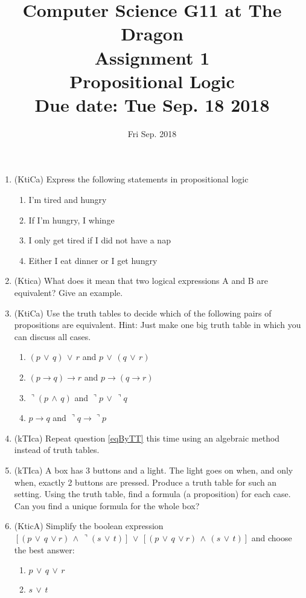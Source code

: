 \documentclass{article}
\title{
Computer Science G11 at The Dragon \\
Assignment 1 \\
Propositional Logic\\
\bf{Due date: Tue Sep. 18 2018}
}
\begin{document}
\maketitle
\date{Fri Sep. 2018}


\begin{enumerate}
\item (KtiCa) Express the following statements in propositional logic
\begin{enumerate}
\item I'm tired and hungry
\item If I'm hungry, I whinge
\item I only get tired if I did not have a nap
\item Either I eat dinner or I get hungry
\end{enumerate}
\item (Ktica) What does it mean that two logical expressions A and B are equivalent? Give an example.
\item \label{eqByTT} (KtiCa) Use the truth tables to decide which of the following pairs of propositions are equivalent. Hint: Just make one big truth table in
which you can discuss all cases.
\begin{enumerate}
\item $(p\,\vee\,q)\,\vee\,r $ and $p\,\vee\,(q\,\vee\,r)$
\item $(p\rightarrow q)\rightarrow r$ and $p\rightarrow (q\rightarrow r)$
\item $\urcorner (p\,\wedge\,q)$ and $\urcorner p\,\vee\,\urcorner q$
\item $p\rightarrow q$ and $\urcorner q \rightarrow \urcorner p$
\end{enumerate}
\item (kTIca) Repeat question \ref{eqByTT} this time using an algebraic method instead of truth tables.
\item (kTIca) A box has 3 buttons and a light. The light goes on when, and only when, exactly 2 buttons are pressed. Produce a truth table for 
such an setting. Using the truth table, find a formula (a proposition) for each case. Can you find a unique formula for the whole box?
\item (KticA) Simplify the boolean expression $\left[ (p\,\vee\,q\,\vee r)\,\wedge\,\urcorner (s\,\vee\,t)\right]\,\vee\,\left[ (p\,\vee\,q\,\vee r)\,\wedge\,(s\,\vee\,t)\right]$ 
and choose the best answer:
\begin{enumerate}
\item $p\,\vee\,q\,\vee\,r$
\item $s\,\vee\,t$

\end{enumerate}
\end{enumerate}
\end{document}
